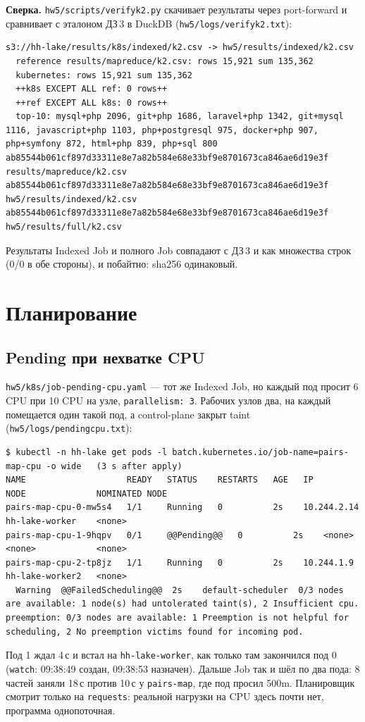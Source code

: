 \documentclass[11pt,a4paper]{article}
\DeclareRobustCommand{\code}[1]{\begingroup\renewcommand{\_}{\textunderscore\allowbreak}\renewcommand{\slash}{/\allowbreak}\texttt{#1}\endgroup}
\newcommand{\logf}[1]{\code{hw5\slash logs\slash #1}}
\begin{document}
\textbf{Сверка.} \code{hw5/scripts/verify\_k2.py} скачивает результаты через port-forward и сравнивает с эталоном ДЗ\,3 в DuckDB (\logf{08\_verify\_k2.txt}):
\begin{lstlisting}
s3://hh-lake/results/k8s/indexed/k2.csv -> hw5/results/indexed/k2.csv
  reference results/mapreduce/k2.csv: rows 15,921 sum 135,362
  kubernetes: rows 15,921 sum 135,362
  ++k8s EXCEPT ALL ref: 0 rows++
  ++ref EXCEPT ALL k8s: 0 rows++
  top-10: mysql+php 2096, git+php 1686, laravel+php 1342, git+mysql 1116, javascript+php 1103, php+postgresql 975, docker+php 907, php+symfony 872, html+php 839, php+sql 800
ab85544b061cf897d33311e8e7a82b584e68e33bf9e8701673ca846ae6d19e3f  results/mapreduce/k2.csv
ab85544b061cf897d33311e8e7a82b584e68e33bf9e8701673ca846ae6d19e3f  hw5/results/indexed/k2.csv
ab85544b061cf897d33311e8e7a82b584e68e33bf9e8701673ca846ae6d19e3f  hw5/results/full/k2.csv
\end{lstlisting}
Результаты Indexed Job и полного Job совпадают с ДЗ\,3 и как множества строк (0/0 в обе стороны), и побайтно: sha256 одинаковый.

\section{Планирование}

\subsection{Pending при нехватке CPU}

\code{hw5/k8s/job-pending-cpu.yaml} --- тот же Indexed Job, но каждый под просит 6 CPU при 10 CPU на узле, \code{parallelism: 3}. Рабочих узлов два, на каждый помещается один такой под, а control-plane закрыт taint (\logf{09\_pending\_cpu.txt}):
\begin{lstlisting}
$ kubectl -n hh-lake get pods -l batch.kubernetes.io/job-name=pairs-map-cpu -o wide   (3 s after apply)
NAME                    READY   STATUS    RESTARTS   AGE   IP            NODE              NOMINATED NODE
pairs-map-cpu-0-mw5s4   1/1     Running   0          2s    10.244.2.14   hh-lake-worker    <none>
pairs-map-cpu-1-9hqpv   0/1     @@Pending@@   0          2s    <none>        <none>            <none>
pairs-map-cpu-2-tp8jz   1/1     Running   0          2s    10.244.1.9    hh-lake-worker2   <none>
  Warning  @@FailedScheduling@@  2s    default-scheduler  0/3 nodes are available: 1 node(s) had untolerated taint(s), 2 Insufficient cpu. preemption: 0/3 nodes are available: 1 Preemption is not helpful for scheduling, 2 No preemption victims found for incoming pod.
\end{lstlisting}
Под 1 ждал 4\,с и встал на \code{hh-lake-worker}, как только там закончился под 0 (\code{watch}: 09:38:49 создан, 09:38:53 назначен). Дальше Job так и шёл по два пода: 8 частей заняли 18\,с против 10\,с у \code{pairs-map}, где под просил 500m. Планировщик смотрит только на \code{requests}: реальной нагрузки на CPU здесь почти нет, программа однопоточная.
\end{document}
